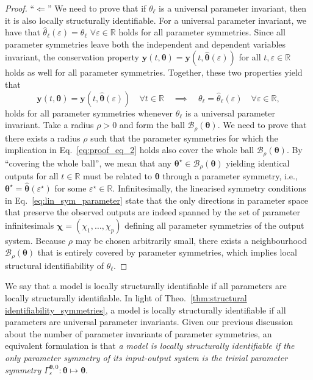 \documentclass[12pt]{article}
\begin{document}
\begin{proof}
  ``$\Longleftarrow$'' We need to prove that if $\theta_{\ell}$ is a universal parameter invariant, then it is also locally structurally identifiable. For a universal parameter invariant, we have that $\hat{\theta}_{\ell}(\varepsilon)=\theta_{\ell}\,\,\forall\varepsilon\in\mathbb{R}$ holds for all parameter symmetries. Since all parameter symmetries leave both the independent and dependent variables invariant, the conservation property $\mathbf{y}(t,\boldsymbol{\theta})=\mathbf{y}(t,\hat{\boldsymbol{\theta}}(\varepsilon))$ for all ${t,\varepsilon}\in\mathbb{R}$ holds as well for all parameter symmetries. Together, these two properties yield that
  \begin{equation}
  \mathbf{y}(t,\boldsymbol{\theta})=\mathbf{y}(t,\hat{\boldsymbol{\theta}}(\varepsilon))\quad\forall{t}\in\mathbb{R}\quad\implies\quad\theta_{\ell}=\hat{\theta}_{\ell}(\varepsilon)\quad\forall\varepsilon\in\mathbb{R},
  \label{eq:proof_eq_2}
  \end{equation}
  holds for all parameter symmetries whenever $\theta_{\ell}$ is a universal parameter invariant. Take a radius $\rho>0$ and form the ball $\mathcal{B}_{\rho}\left(\boldsymbol{\theta}\right)$. We need to prove that there exists a radius $\rho$ such that the parameter symmetries for which the implication in Eq.~\eqref{eq:proof_eq_2} holds also cover the whole ball $\mathcal{B}_{\rho}\left(\boldsymbol{\theta}\right)$. By ``covering the whole ball'', we mean that any $\boldsymbol{\theta}^{\star} \in \mathcal{B}_{\rho}(\boldsymbol{\theta})$ yielding identical outputs for all $t \in \mathbb{R}$ must be related to $\boldsymbol{\theta}$ through a parameter symmetry, i.e., $\boldsymbol{\theta}^{\star} = \hat{\boldsymbol{\theta}}(\varepsilon^{\star})$ for some $\varepsilon^{\star} \in \mathbb{R}$. Infinitesimally, the linearised symmetry conditions in Eq.~\eqref{eq:lin_sym_parameter} state that the only directions in parameter space that preserve the observed outputs are indeed spanned by the set of parameter infinitesimals $\boldsymbol{\chi}=(\chi_{1},\ldots,\chi_{p})$ defining all parameter symmetries of the output system. Because $\rho$ may be chosen arbitrarily small, there exists a neighbourhood $\mathcal{B}_{\rho}(\boldsymbol{\theta})$ that is entirely covered by parameter symmetries, which implies local structural identifiability of $\theta_{\ell}$.
  \end{proof}

We say that a model is locally structurally identifiable if all parameters are locally structurally identifiable. In light of Theo.~\ref{thm:structural identifiability_symmetries}, a model is locally structurally identifiable if all parameters are universal parameter invariants. Given our previous discussion about the number of parameter invariants of parameter symmetries, an equivalent formulation is that \textit{a model is locally structurally identifiable if the only parameter symmetry of its input-output system is the trivial parameter symmetry $\Gamma_{\varepsilon}^{\boldsymbol{\theta},0}:\boldsymbol{\theta}\mapsto\boldsymbol{\theta}$}. 
\end{document}
